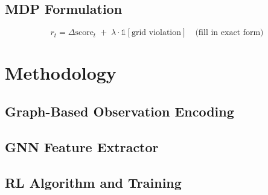 \documentclass[conference]{IEEEtran}
\begin{document}
\subsection{MDP Formulation}

\begin{equation}
\label{eq:reward}
r_t = \Delta \text{score}_t \;+\; \lambda \cdot \mathbb{1}[\text{grid violation}] \quad \text{(fill in exact form)}
\end{equation}

\section{Methodology}

\subsection{Graph-Based Observation Encoding}

\subsection{GNN Feature Extractor}

\subsection{RL Algorithm and Training}
\end{document}
